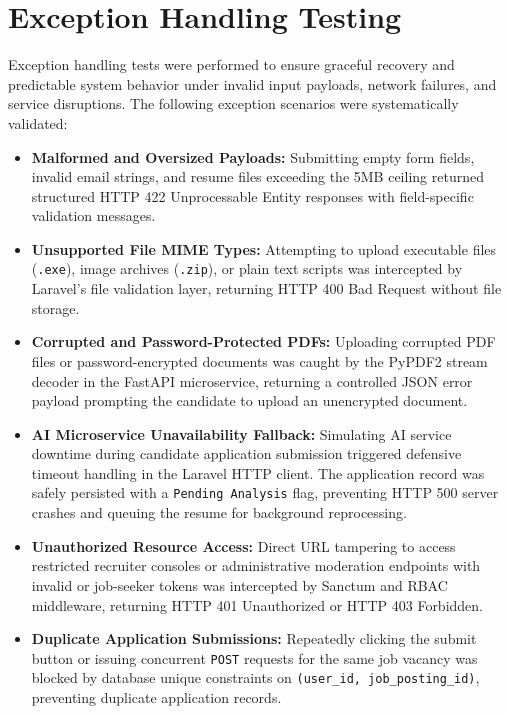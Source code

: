 \section{Exception Handling Testing}
Exception handling tests were performed to ensure graceful recovery and predictable system behavior under invalid input payloads, network failures, and service disruptions. The following exception scenarios were systematically validated:
\begin{itemize}
    \item \textbf{Malformed and Oversized Payloads:} Submitting empty form fields, invalid email strings, and resume files exceeding the 5MB ceiling returned structured HTTP 422 Unprocessable Entity responses with field-specific validation messages.
    \item \textbf{Unsupported File MIME Types:} Attempting to upload executable files (\texttt{.exe}), image archives (\texttt{.zip}), or plain text scripts was intercepted by Laravel's file validation layer, returning HTTP 400 Bad Request without file storage.
    \item \textbf{Corrupted and Password-Protected PDFs:} Uploading corrupted PDF files or password-encrypted documents was caught by the PyPDF2 stream decoder in the FastAPI microservice, returning a controlled JSON error payload prompting the candidate to upload an unencrypted document.
    \item \textbf{AI Microservice Unavailability Fallback:} Simulating AI service downtime during candidate application submission triggered defensive timeout handling in the Laravel HTTP client. The application record was safely persisted with a \texttt{Pending Analysis} flag, preventing HTTP 500 server crashes and queuing the resume for background reprocessing.
    \item \textbf{Unauthorized Resource Access:} Direct URL tampering to access restricted recruiter consoles or administrative moderation endpoints with invalid or job-seeker tokens was intercepted by Sanctum and RBAC middleware, returning HTTP 401 Unauthorized or HTTP 403 Forbidden.
    \item \textbf{Duplicate Application Submissions:} Repeatedly clicking the submit button or issuing concurrent \texttt{POST} requests for the same job vacancy was blocked by database unique constraints on \texttt{(user\_id, job\_posting\_id)}, preventing duplicate application records.
\end{itemize}

